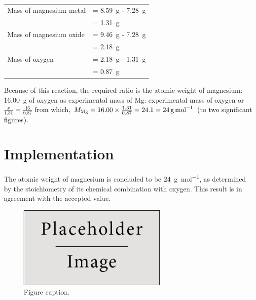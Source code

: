 \documentclass{article}
\begin{document}
\begin{tabular}{ll}
Mass of magnesium metal & = \SI{8.59}{\gram} - \SI{7.28}{\gram}\\
& = \SI{1.31}{\gram}\\
Mass of magnesium oxide & = \SI{9.46}{\gram} - \SI{7.28}{\gram}\\
& = \SI{2.18}{\gram}\\
Mass of oxygen & = \SI{2.18}{\gram} - \SI{1.31}{\gram}\\
& = \SI{0.87}{\gram}
\end{tabular}

Because of this reaction, the required ratio is the atomic weight of magnesium: \SI{16.00}{\gram} of oxygen as experimental mass of Mg: experimental mass of oxygen or $\frac{x}{1.31}=\frac{16}{0.87}$ from which, $M_{\ce{Mg}} = 16.00 \times \frac{1.31}{0.87} = 24.1 = \SI{24}{\gram\per\mole}$ (to two significant figures).


\section{Implementation}

The atomic weight of magnesium is concluded to be \SI{24}{\gram\per\mol}, as determined by the stoichiometry of its chemical combination with oxygen. This result is in agreement with the accepted value.

\begin{figure}[h]
\begin{center}
\includegraphics[width=0.65\textwidth]{placeholder} %
\caption{Figure caption.}
\end{center}
\end{figure}

\end{document}
